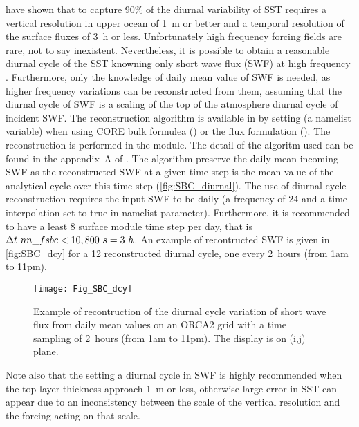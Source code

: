 \documentclass[../main/NEMO_manual]{subfiles}
\begin{document}
\cite{Bernie_al_JC05} have shown that to capture 90$\%$ of the diurnal variability of SST requires a vertical resolution in upper ocean of 1~m or better and a temporal resolution of the surface fluxes of 3~h or less.
Unfortunately high frequency forcing fields are rare, not to say inexistent.
Nevertheless, it is possible to obtain a reasonable diurnal cycle of the SST knowning only short wave flux (SWF) at
high frequency \citep{Bernie_al_CD07}.
Furthermore, only the knowledge of daily mean value of SWF is needed,
as higher frequency variations can be reconstructed from them,
assuming that the diurnal cycle of SWF is a scaling of the top of the atmosphere diurnal cycle of incident SWF.
The \cite{Bernie_al_CD07} reconstruction algorithm is available in \NEMO by
setting  (a \textit{} namelist variable) when
using CORE bulk formulea () or
the flux formulation ().
The reconstruction is performed in the  module.
The detail of the algoritm used can be found in the appendix~A of \cite{Bernie_al_CD07}.
The algorithm preserve the daily mean incoming SWF as the reconstructed SWF at
a given time step is the mean value of the analytical cycle over this time step (\autoref{fig:SBC_diurnal}).
The use of diurnal cycle reconstruction requires the input SWF to be daily
(\ie a frequency of 24 and a time interpolation set to true in  namelist parameter).
Furthermore, it is recommended to have a least 8 surface module time step per day,
that is  $\rdt \ nn\_fsbc < 10,800~s = 3~h$.
An example of recontructed SWF is given in \autoref{fig:SBC_dcy} for a 12 reconstructed diurnal cycle,
one every 2~hours (from 1am to 11pm).

\begin{figure}[!t]
  \begin{center}
    \texttt{[image: Fig\_SBC\_dcy]}
    \caption{
      \protect\label{fig:SBC_dcy}
      Example of recontruction of the diurnal cycle variation of short wave flux from
      daily mean values on an ORCA2 grid with a time sampling of 2~hours (from 1am to 11pm).
      The display is on (i,j) plane.
    }
  \end{center}
\end{figure}

Note also that the setting a diurnal cycle in SWF is highly recommended when
the top layer thickness approach 1~m or less, otherwise large error in SST can appear due to
an inconsistency between the scale of the vertical resolution and the forcing acting on that scale.
\end{document}
